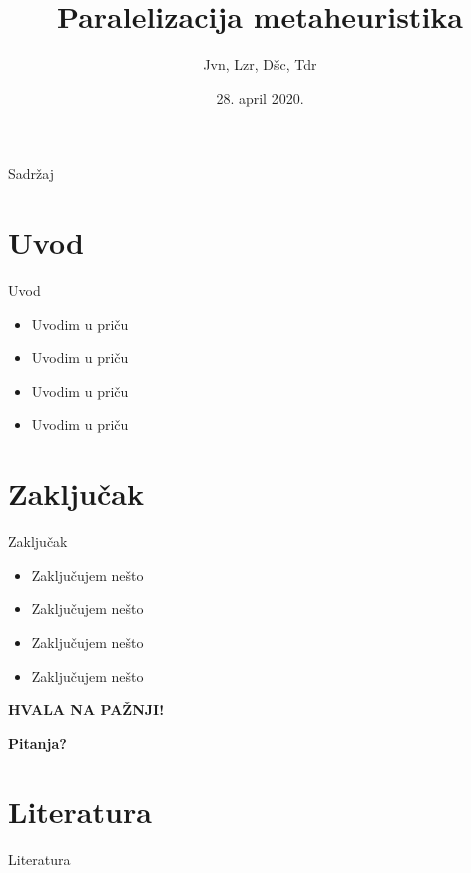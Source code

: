 \documentclass{beamer}
\title{Paralelizacija metaheuristika}
\author{Jvn, Lzr, Dšc, Tdr}
\institute{Matematički fakultet, Univerzitet u Beogradu\\\url{https://github.com/jvn-mirkov/msnr-2020}}
\date{28. april 2020.}
\begin{document}
\frame{\titlepage}

\begin{frame}{Sadržaj}
\tableofcontents
\end{frame}

\section{Uvod}
\begin{frame}{Uvod}
\begin{itemize}
\item Uvodim u priču

\item Uvodim u priču

\item Uvodim u priču

\item Uvodim u priču
\end{itemize}
\end{frame}

\section{Zaključak}
\begin{frame}{Zaključak}
\begin{itemize}
\item Zaključujem nešto

\item Zaključujem nešto

\item Zaključujem nešto

\item Zaključujem nešto
\end{itemize}
\end{frame}

\begin{frame}
\centering \LARGE
\textbf{HVALA NA PAŽNJI!}

\textbf{Pitanja?}
\end{frame}

\section{Literatura}
\begin{frame}{Literatura}
\nocite{*}

%
\end{frame}
\end{document}
